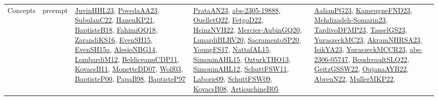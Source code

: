 {\begin{longtable}{lp{3cm}>{\raggedright}p{6cm}>{\raggedright}p{6cm}p{8cm}}
Concepts & preempt & \href{papers/JuvinHHL23.pdf}{JuvinHHL23}\cite{JuvinHHL23}, \href{papers/PovedaAA23.pdf}{PovedaAA23}\cite{PovedaAA23}, \href{articles/SubulanC22.pdf}{SubulanC22}\cite{SubulanC22}, \href{papers/HanenKP21.pdf}{HanenKP21}\cite{HanenKP21}, \href{articles/BaptisteB18.pdf}{BaptisteB18}\cite{BaptisteB18}, \href{articles/FahimiOQ18.pdf}{FahimiOQ18}\cite{FahimiOQ18}, \href{articles/ZarandiKS16.pdf}{ZarandiKS16}\cite{ZarandiKS16}, \href{papers/EvenSH15.pdf}{EvenSH15}\cite{EvenSH15}, \href{articles/EvenSH15a.pdf}{EvenSH15a}\cite{EvenSH15a}, \href{papers/AlesioNBG14.pdf}{AlesioNBG14}\cite{AlesioNBG14}, \href{articles/LombardiM12.pdf}{LombardiM12}\cite{LombardiM12}, \href{articles/BeldiceanuCDP11.pdf}{BeldiceanuCDP11}\cite{BeldiceanuCDP11}, \href{articles/KovacsB11.pdf}{KovacsB11}\cite{KovacsB11}, \href{papers/MonetteDD07.pdf}{MonetteDD07}\cite{MonetteDD07}, \href{papers/Wolf03.pdf}{Wolf03}\cite{Wolf03}, \href{articles/BaptisteP00.pdf}{BaptisteP00}\cite{BaptisteP00}, \href{articles/PapaB98.pdf}{PapaB98}\cite{PapaB98}, \href{papers/BaptisteP97.pdf}{BaptisteP97}\cite{BaptisteP97} & \href{articles/PrataAN23.pdf}{PrataAN23}\cite{PrataAN23}, \href{articles/abs-2305-19888.pdf}{abs-2305-19888}\cite{abs-2305-19888}, \href{papers/OuelletQ22.pdf}{OuelletQ22}\cite{OuelletQ22}, \href{articles/FetgoD22.pdf}{FetgoD22}\cite{FetgoD22}, \href{articles/HeinzNVH22.pdf}{HeinzNVH22}\cite{HeinzNVH22}, \href{papers/Mercier-AubinGQ20.pdf}{Mercier-AubinGQ20}\cite{Mercier-AubinGQ20}, \href{articles/LunardiBLRV20.pdf}{LunardiBLRV20}\cite{LunardiBLRV20}, \href{articles/SacramentoSP20.pdf}{SacramentoSP20}\cite{SacramentoSP20}, \href{papers/YoungFS17.pdf}{YoungFS17}\cite{YoungFS17}, \href{articles/NattafAL15.pdf}{NattafAL15}\cite{NattafAL15}, \href{articles/SimoninAHL15.pdf}{SimoninAHL15}\cite{SimoninAHL15}, \href{articles/OzturkTHO13.pdf}{OzturkTHO13}\cite{OzturkTHO13}, \href{papers/SimoninAHL12.pdf}{SimoninAHL12}\cite{SimoninAHL12}, \href{articles/SchuttFSW11.pdf}{SchuttFSW11}\cite{SchuttFSW11}, \href{papers/Laborie09.pdf}{Laborie09}\cite{Laborie09}, \href{papers/SchuttFSW09.pdf}{SchuttFSW09}\cite{SchuttFSW09}, \href{articles/KovacsB08.pdf}{KovacsB08}\cite{KovacsB08}, \href{papers/ArtiouchineB05.pdf}{ArtiouchineB05}\cite{ArtiouchineB05} & \href{papers/AalianPG23.pdf}{AalianPG23}\cite{AalianPG23}, \href{papers/KameugneFND23.pdf}{KameugneFND23}\cite{KameugneFND23}, \href{papers/Mehdizadeh-Somarin23.pdf}{Mehdizadeh-Somarin23}\cite{Mehdizadeh-Somarin23}, \href{papers/TardivoDFMP23.pdf}{TardivoDFMP23}\cite{TardivoDFMP23}, \href{papers/TasselGS23.pdf}{TasselGS23}\cite{TasselGS23}, \href{papers/YuraszeckMC23.pdf}{YuraszeckMC23}\cite{YuraszeckMC23}, \href{articles/AkramNHRSA23.pdf}{AkramNHRSA23}\cite{AkramNHRSA23}, \href{articles/IsikYA23.pdf}{IsikYA23}\cite{IsikYA23}, \href{articles/YuraszeckMCCR23.pdf}{YuraszeckMCCR23}\cite{YuraszeckMCCR23}, \href{articles/abs-2306-05747.pdf}{abs-2306-05747}\cite{abs-2306-05747}, \href{papers/BoudreaultSLQ22.pdf}{BoudreaultSLQ22}\cite{BoudreaultSLQ22}, \href{papers/GeitzGSSW22.pdf}{GeitzGSSW22}\cite{GeitzGSSW22}, \href{papers/OujanaAYB22.pdf}{OujanaAYB22}\cite{OujanaAYB22}, \href{articles/AbreuN22.pdf}{AbreuN22}\cite{AbreuN22}, \href{articles/MullerMKP22.pdf}{MullerMKP22}\cite{MullerMKP22}, 
\end{longtable}}
